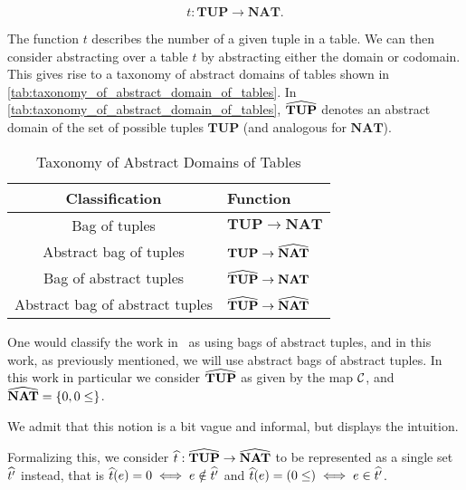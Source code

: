\begin{equation}
    t : \mathbf{TUP} \rightarrow \mathbf{NAT}.\label{eq:equation-tup-nat}
\end{equation}


The function $t$ describes the number of a given tuple in a table.
We can then consider abstracting over a table $t$ by abstracting either the domain or codomain.
This gives rise to a taxonomy of abstract domains of tables shown in \autoref{tab:taxonomy_of_abstract_domain_of_tables}.
In \autoref{tab:taxonomy_of_abstract_domain_of_tables}, $\widehat{\mathbf{TUP}}$ denotes an abstract domain of the set of possible tuples $\mathbf{TUP}$ (and analogous for $\mathbf{NAT}$).


\begin{table}
    \renewcommand{\arraystretch}{1.3}
    \caption{Taxonomy of Abstract Domains of Tables}
    \centering
    \begin{tabular}{c|l}
        \toprule
        Classification                  & Function                                \\ \midrule
        Bag of tuples                   & $\mathbf{TUP} \rightarrow \mathbf{NAT}$           \\
        Abstract bag of tuples          & $\mathbf{TUP} \rightarrow \widehat{\mathbf{NAT}}$      \\
        Bag of abstract tuples          & $\widehat{\mathbf{TUP}} \rightarrow \mathbf{NAT}$      \\
        Abstract bag of abstract tuples & $\widehat{\mathbf{TUP}} \rightarrow \widehat{\mathbf{NAT}}$ \\ \bottomrule
    \end{tabular}
    \label{tab:taxonomy_of_abstract_domain_of_tables}
\end{table}

One would classify the work in~\cite{halder_abstract_2012} as using bags of abstract tuples, and in this work, as previously mentioned, we will use abstract bags of abstract tuples.
In this work in particular we consider $\widehat{\mathbf{TUP}}$ as given by the map $\mathcal{C}$, and $\widehat{\mathbf{NAT}} = \{0, 0 \leq\}$.

We admit that this notion is a bit vague and informal, but displays the intuition.

Formalizing this, we consider $\widehat{t} : \widehat{\mathbf{TUP}} \rightarrow \widehat{\mathbf{NAT}}$ to be represented as a single set $\widehat{t'}$ instead, that is $\widehat{t}({e}) = 0 \iff e \notin \widehat{t'}$ and  $\widehat{t}({e}) = (0 \leq) \iff e \in \widehat{t'}$.


